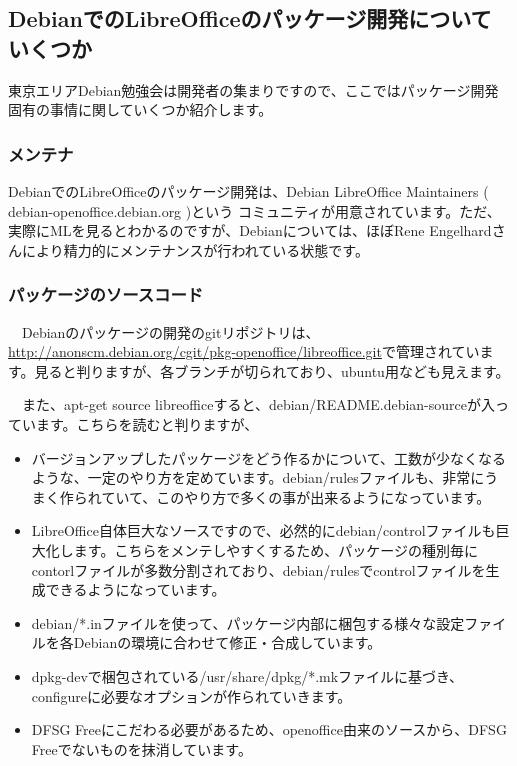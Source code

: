 \documentclass[mingoth,a4paper]{jsarticle}
\begin{document}
\subsection{DebianでのLibreOfficeのパッケージ開発についていくつか}

 東京エリアDebian勉強会は開発者の集まりですので、ここではパッケージ開発固有の事情に関していくつか紹介します。

\subsubsection{メンテナ}

 DebianでのLibreOfficeのパッケージ開発は、Debian LibreOffice Maintainers ( debian-openoffice\@lists.debian.org )という
コミュニティが用意されています。ただ、実際にMLを見るとわかるのですが、Debianについては、ほぼRene Engelhardさんにより精力的にメンテナンスが行われている状態です。

\subsubsection{パッケージのソースコード}

　Debianのパッケージの開発のgitリポジトリは、\url{http://anonscm.debian.org/cgit/pkg-openoffice/libreoffice.git}で管理されています。見ると判りますが、各ブランチが切られており、ubuntu用なども見えます。

　また、apt-get source libreofficeすると、debian/README.debian-sourceが入っています。こちらを読むと判りますが、

\begin{itemize}
\item バージョンアップしたパッケージをどう作るかについて、工数が少なくなるような、一定のやり方を定めています。debian/rulesファイルも、非常にうまく作られていて、このやり方で多くの事が出来るようになっています。
\item LibreOffice自体巨大なソースですので、必然的にdebian/controlファイルも巨大化します。こちらをメンテしやすくするため、パッケージの種別毎にcontorlファイルが多数分割されており、debian/rulesでcontrolファイルを生成できるようになっています。
\item debian/*.inファイルを使って、パッケージ内部に梱包する様々な設定ファイルを各Debianの環境に合わせて修正・合成しています。
\item dpkg-devで梱包されている/usr/share/dpkg/*.mkファイルに基づき、configureに必要なオプションが作られていきます。
\item DFSG Freeにこだわる必要があるため、openoffice由来のソースから、DFSG Freeでないものを抹消しています。
\end{itemize}
\end{document}
